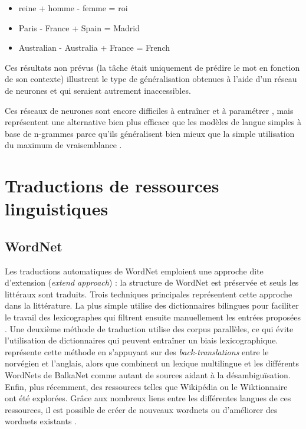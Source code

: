 \begin{itemize}
    \item reine + homme - femme = roi
    \item Paris - France + Spain = Madrid
    \item Australian - Australia + France = French
\end{itemize}

Ces résultats non prévus (la tâche était uniquement de prédire le mot en
fonction de son contexte) illustrent le type de généralisation obtenues à
l'aide d'un réseau de neurones et qui seraient autrement inaccessibles.

Ces réseaux de neurones sont encore difficiles à entraîner et à paramétrer
\citep{do2014modeles}, mais représentent une alternative bien plus efficace que
les modèles de langue simples à base de n-grammes parce qu'ils généralisent
bien mieux que la simple utilisation du maximum de vraisemblance
\citep{olah2014deep}.


\section{Traductions de ressources linguistiques}
\label{sec:translation}

\subsection{WordNet}

Les traductions automatiques de WordNet emploient une approche dite d'extension
(\textit{extend approach}) : la structure de WordNet est préservée et seuls les
littéraux sont traduits. Trois techniques principales représentent cette
approche dans la littérature. La plus simple utilise des dictionnaires
bilingues pour faciliter le travail des lexicographes qui filtrent ensuite
manuellement les entrées proposées
\citep{vossen1998eurowordnet,pianta2002developing,tufis2004balkanet}. Une
deuxième méthode de traduction utilise des corpus parallèles, ce qui évite
l'utilisation de dictionnaires qui peuvent entraîner un biais lexicographique.
\cite{dyvik2004translations} représente cette méthode en s'appuyant sur des
\textit{back-translations} entre le norvégien et l'anglais, alors que
\citep{sagot2008construction} combinent un lexique multilingue et les
différents WordNets de BalkaNet comme autant de sources aidant à la
désambiguïsation. Enfin, plus récemment, des ressources telles que Wikipédia ou
le Wiktionnaire ont été explorées. Grâce aux nombreux liens entre les
différentes langues de ces ressources, il est possible de créer de nouveaux
wordnets \citep{demelo2009towards,navigli2010babelnet} ou d'améliorer des
wordnets existants \citep{hanoka2012wordnet}.

